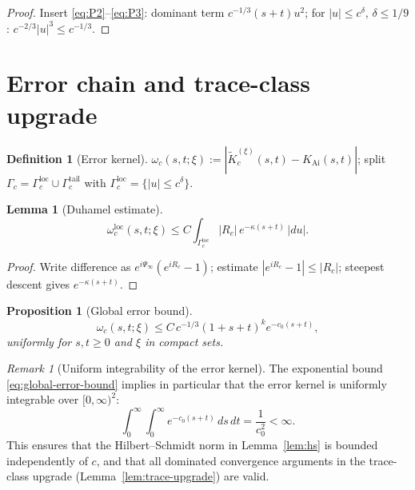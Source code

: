 \documentclass[12pt,a4paper]{amsart}
\newtheorem{lemma}[theorem]{Lemma}
\newtheorem{proposition}[theorem]{Proposition}
\theoremstyle{definition}
\newtheorem{definition}[theorem]{Definition}
\theoremstyle{remark}
\newtheorem{remark}[theorem]{Remark}
\begin{document}
\begin{proof}
Insert \eqref{eq:P2}--\eqref{eq:P3}: dominant term $c^{-1/3}(s+t)u^2$;
for $|u|\le c^\delta$, $\delta\le 1/9$: $c^{-2/3}|u|^3\le c^{-1/3}$.
\end{proof}

\section{Error chain and trace-class upgrade}
\label{sec:error-chain}

\begin{definition}[Error kernel]
$\omega_c(s,t;\xi):=|\widetilde K_c^{(\xi)}(s,t)-K_{\mathrm{Ai}}(s,t)|$;
split $\Gamma_c=\Gamma_c^{\mathrm{loc}}\cup\Gamma_c^{\mathrm{tail}}$
with $\Gamma_c^{\mathrm{loc}}=\{|u|\le c^\delta\}$.
\end{definition}

\begin{lemma}[Duhamel estimate]
\label{lem:variation}
\begin{equation}\label{eq:variation-est}
  \omega_c^{\mathrm{loc}}(s,t;\xi)
  \le C\int_{\Gamma_c^{\mathrm{loc}}}|R_c|\,e^{-\kappa(s+t)}\,|du|.
\end{equation}
\end{lemma}

\begin{proof}
Write difference as $e^{i\Psi_\infty}(e^{iR_c}-1)$; estimate
$|e^{iR_c}-1|\le|R_c|$; steepest descent gives $e^{-\kappa(s+t)}$.
\end{proof}

\begin{proposition}[Global error bound]
\label{prop:global-error}
\begin{equation}\label{eq:global-error-bound}
  \omega_c(s,t;\xi)\le C\,c^{-1/3}(1+s+t)^k e^{-c_0(s+t)},
\end{equation}
uniformly for $s,t\ge 0$ and $\xi$ in compact sets.
\end{proposition}

\begin{remark}[Uniform integrability of the error kernel]
\label{rem:uniform-integrability}
The exponential bound \eqref{eq:global-error-bound} implies in particular
that the error kernel is uniformly integrable over $[0,\infty)^2$:
\[
  \int_0^\infty\!\int_0^\infty e^{-c_0(s+t)}\,ds\,dt
  = \frac{1}{c_0^2} < \infty.
\]
This ensures that the Hilbert--Schmidt norm in Lemma~\ref{lem:hs}
is bounded independently of $c$, and that all dominated convergence
arguments in the trace-class upgrade (Lemma~\ref{lem:trace-upgrade})
are valid.
\end{remark}
\end{document}
